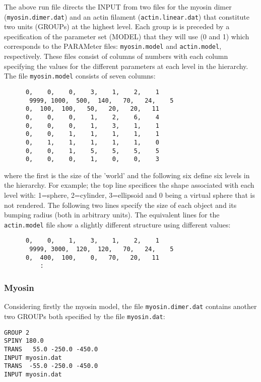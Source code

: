The above run file directs the INPUT from two files for the myosin dimer
({\tt myosin.dimer.dat}) and an actin filament ({\tt actin.linear.dat})
that constitute two units (GROUPs) at the highest level.  Each group is 
is preceded by a specification of the parameter set (MODEL) that they
will use (0 and 1) which corresponds to the PARAMeter files:
{\tt myosin.model} and {\tt actin.model}, respectively.  These files consist
of columns of numbers with each column specifying the values for the
different parameters at each level in the hierarchy.   The file 
{\tt myosin.model} consists of seven columns:

\begin{verbatim}
	  0,    0,    0,    3,    1,    2,    1
       9999, 1000,  500,  140,   70,   24,    5
	  0,  100,  100,   50,   20,   20,   11
	  0,    0,    0,    1,    2,    6,    4
	  0,    0,    0,    1,    3,    1,    1
	  0,    0,    1,    1,    1,    1,    1
	  0,    1,    1,    1,    1,    1,    0
	  0,    0,    1,    5,    5,    5,    5
	  0,    0,    0,    1,    0,    0,    3
\end{verbatim}

where the first is the size of the 'world' and the following six define
six levels in the hierarchy.  For example; the top line specifices the shape
associated with each level with: 1=sphere, 2=cylinder, 3=ellipsoid and 
0 being a virtual sphere that is not rendered.  The following two lines
specify the size of each object and its bumping radius (both in arbitrary
units).   The equivalent lines for the {\tt actin.model} file show a
slightly different structure using different values:

\begin{verbatim}
	  0,    0,    1,    3,    1,    2,    1
       9999, 3000,  120,  120,   70,   24,    5
	  0,  400,  100,    0,   70,   20,   11
          :
\end{verbatim}

\subsubsection{Myosin}

Considering firstly the myosin model, the file {\tt myosin.dimer.dat} contains
another two GROUPs both specified by the file {\tt myosin.dat}:

\begin{verbatim}
GROUP 2
SPINY 180.0
TRANS   55.0 -250.0 -450.0
INPUT myosin.dat
TRANS  -55.0 -250.0 -450.0
INPUT myosin.dat
\end{verbatim}

